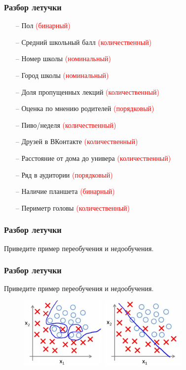 \documentclass[12pt]{beamer}
\begin{document}
\begin{frame}\frametitle{Разбор летучки}
\begin{itemize}
\item[--] Пол \textcolor{red}{(бинарный)}
\item[--] Средний школьный балл \textcolor{red}{(количественный)}
\item[--] Номер школы \textcolor{red}{(номинальный)}
\item[--] Город школы  \textcolor{red}{(номинальный)}
\item[--] Доля пропущенных лекций   \textcolor{red}{(количественный)}
\item[--] Оценка по мнению родителей   \textcolor{red}{(порядковый)}
\item[--] Пиво/неделя    \textcolor{red}{(количественный)}
\item[--] Друзей в ВКонтакте   \textcolor{red}{(количественный)}
\item[--] Расстояние от дома до универа  \textcolor{red}{(количественный)}
\item[--] Ряд в аудитории  \textcolor{red}{(порядковый)}
\item[--] Наличие планшета  \textcolor{red}{(бинарный)}
\item[--] Периметр головы   \textcolor{red}{(количественный)}
\end{itemize}
\end{frame}

\begin{frame}\frametitle{Разбор летучки}
Приведите пример переобучения и недообучения.
\end{frame}

\begin{frame}\frametitle{Разбор летучки}
Приведите пример переобучения и недообучения.
\begin{figure}[htbp]
  \includegraphics[height=100pt, keepaspectratio = true]{overfitting}  
    \includegraphics[height=100pt, keepaspectratio = true]{underfitting}  
\end{figure}
\end{frame}
\end{document}
